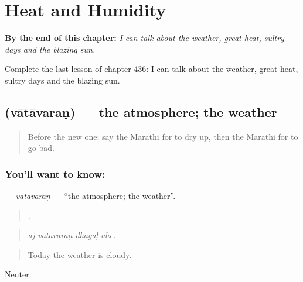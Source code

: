 
\chapter{Heat and Humidity}
\label{ch:mr-heat-and-humidity}

\begin{chapteropening}
\textbf{By the end of this chapter:} \emph{I can talk about the weather, great heat, sultry days and the blazing sun.}

Complete the last lesson of chapter 436: I can talk about the weather, great heat, sultry days and the blazing sun.
\end{chapteropening}

\section[\texorpdfstring{\mr{वातावरण} (vātāvaraṇ)}{वातावरण (vātāvaraṇ)}]{ (vātāvaraṇ) — the atmosphere; the weather}

\label{lesson:MR-C436-vatavaran}



\begin{quote}
Before the new one: say the Marathi for to dry up, then the Marathi for to go bad.
\end{quote}

\subsection*{You'll want to know: }
\textbf{} — \emph{vātāvaraṇ} — \textquotedblleft{}the atmosphere; the weather\textquotedblright{}.

\begin{quote}
   .
\end{quote}

\begin{quote}
\emph{āj vātāvaraṇ ḍhagāḷ āhe.}
\end{quote}

\begin{quote}
Today the weather is cloudy.
\end{quote}

Neuter.

